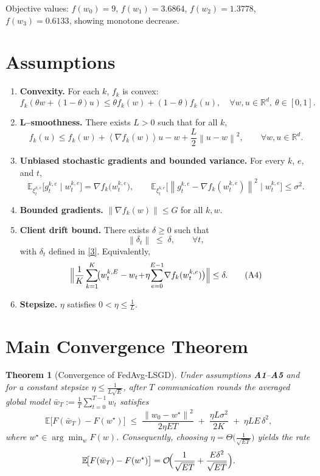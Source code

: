 \documentclass{article}
\newtheorem{theorem}{Theorem}
\newcommand{\E}{\mathbb{E}}
\newcommand{\R}{\mathbb{R}}
\newcommand{\norm}[1]{\left\lVert #1\right\rVert}
\newcommand{\inner}[1]{\left\langle #1\right\rangle}
\begin{document}
Objective values: $f(w_0)=9$, $f(w_1)=3.6864$, $f(w_2)=1.3778$, $f(w_3)=0.6133$, showing monotone decrease.

\section*{Assumptions}
\begin{enumerate}[label={A\arabic*}.]
\item \textbf{Convexity.}  For each $k$, $f_k$ is convex:
\[
f_k(\theta w+(1-\theta)u)\le\theta f_k(w)+(1-\theta)f_k(u),\quad\forall w,u\in\R^d,\ \theta\in[0,1].
\tag{A1}
\]

\item \textbf{L–smoothness.}  There exists $L>0$ such that for all $k$,
\[
f_k(u)\le f_k(w)+\inner{\nabla f_k(w)}{u-w}+\frac{L}{2}\norm{u-w}^2,\qquad\forall w,u\in\R^d.
\tag{A2}
\]

\item \textbf{Unbiased stochastic gradients and bounded variance.}  
For every $k$, $e$, and $t$,
\[
\E_{\xi_{t}^{k,e}}\!\bigl[g_{t}^{k,e}\mid w_{t}^{k,e}\bigr]=\nabla f_k\!\bigl(w_{t}^{k,e}\bigr),\qquad
\E_{\xi_{t}^{k,e}}\!\bigl[\norm{g_{t}^{k,e}-\nabla f_k(w_{t}^{k,e})}^2\mid w_{t}^{k,e}\bigr]\le\sigma^2.
\tag{A3}
\]

\item \textbf{Bounded gradients.}  $\norm{\nabla f_k(w)}\le G$ for all $k,w$.

\item \textbf{Client drift bound.}  There exists $\delta\ge0$ such that
\[
\norm{\delta_t}\;\le\;\delta,\qquad\forall t,
\]
with $\delta_t$ defined in \eqref{3}.  
Equivalently,
\[
\Bigl\|\frac1K\sum_{k=1}^K\!\bigl(w_{t}^{k,E}-w_t\!+\!\eta\!\sum_{e=0}^{E-1}\!\nabla f_k(w_{t}^{k,e})\bigr)\Bigr\|\le\delta .
\tag{A4}
\]

\item \textbf{Stepsize.}  $\eta$ satisfies $0<\eta\le \frac1{L}$.
\end{enumerate}

\section*{Main Convergence Theorem}
\begin{theorem}[Convergence of FedAvg‑LSGD]\label{thm:main}
Under assumptions \textbf{A1}–\textbf{A5} and for a constant stepsize $\eta\le\frac1{L\sqrt{E}}$, after $T$ communication rounds the averaged global model $\bar w_T:=\frac1T\sum_{t=0}^{T-1}w_t$ satisfies
\[
\E\!\bigl[F(\bar w_T)-F(w^\star)\bigr]
\;\le\;
\frac{\norm{w_0-w^\star}^2}{2\eta ET}
\;+\;
\frac{\eta L\sigma^2}{2K}
\;+\;
\eta L E\,\delta^2 ,
\tag{4}
\]
where $w^\star\in\arg\min_w F(w)$.
Consequently, choosing $\eta=\Theta\!\bigl(\frac{1}{\sqrt{ET}}\bigr)$ yields the rate
\[
\E\!\bigl[F(\bar w_T)-F(w^\star)\bigr]=\mathcal O\!\Bigl(\frac1{\sqrt{ET}}+\frac{E\delta^2}{\sqrt{ET}}\Bigr).
\]
\end{theorem}
\end{document}
